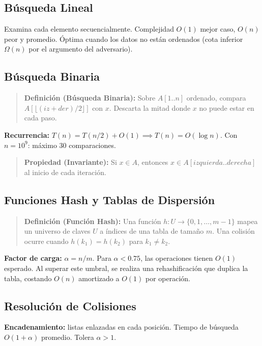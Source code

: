 \documentclass[12pt, letterpaper]{article}
\begin{document}
	\subsection{Búsqueda Lineal}
	Examina cada elemento secuencialmente. Complejidad $O(1)$ mejor caso, $O(n)$ peor y promedio. Óptima cuando los datos no están ordenados (cota inferior $\Omega(n)$ por el argumento del adversario).
	
	\subsection{Búsqueda Binaria}
	
	\begin{quote}
		\textbf{Definición (Búsqueda Binaria):}
		Sobre $A[1..n]$ ordenado, compara $A[\lfloor(iz+der)/2\rfloor]$ con $x$. Descarta la mitad donde $x$ no puede estar en cada paso.
	\end{quote}
	
	\textbf{Recurrencia:} $T(n) = T(n/2) + O(1) \implies T(n) = O(\log n)$. Con $n = 10^9$: máximo 30 comparaciones.
	
	\begin{quote}
		\textbf{Propiedad (Invariante):}
		Si $x \in A$, entonces $x \in A[izquierda..derecha]$ al inicio de cada iteración.
	\end{quote}
	
	\subsection{Funciones Hash y Tablas de Dispersión}
	
	\begin{quote}
		\textbf{Definición (Función Hash):}
		Una función $h: U \to \{0, 1, \ldots, m-1\}$ mapea un universo de claves $U$ a índices de una tabla de tamaño $m$. Una colisión ocurre cuando $h(k_1) = h(k_2)$ para $k_1 \neq k_2$.
	\end{quote}
	
	\textbf{Factor de carga:} $\alpha = n/m$. Para $\alpha < 0.75$, las operaciones tienen $O(1)$ esperado. Al superar este umbral, se realiza una rehashificación que duplica la tabla, costando $O(n)$ amortizado a $O(1)$ por operación.
	
	\subsection{Resolución de Colisiones}
	
	\textbf{Encadenamiento:} listas enlazadas en cada posición. Tiempo de búsqueda $O(1 + \alpha)$ promedio. Tolera $\alpha > 1$.
	
\end{document}
